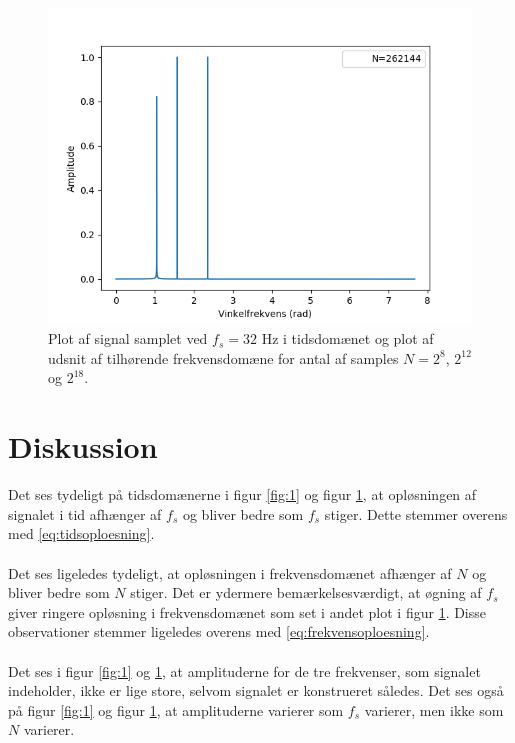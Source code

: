 \begin{figure}
\begin{minipage}{0.49\textwidth}
\includegraphics[width=\textwidth]{figures/frekvensanalyse/32hz_freq3.png}
\end{minipage}
\caption{Plot af signal samplet ved $f_s=32$ Hz i tidsdomænet og plot af udsnit af tilhørende frekvensdomæne for antal af samples $N=2^8$, $2^{12}$ og $2^{18}$.}
\label{fig:2}
\end{figure}
\section{Diskussion}
Det ses tydeligt på tidsdomænerne i figur \ref{fig:1} og figur \ref{fig:2}, at opløsningen af signalet i tid afhænger af $f_s$ og bliver bedre som $f_s$ stiger. Dette stemmer overens med \eqref{eq:tidsoploesning}.\\\\
Det ses ligeledes tydeligt, at opløsningen i frekvensdomænet afhænger af $N$ og bliver bedre som $N$ stiger. Det er ydermere bemærkelsesværdigt, at øgning af $f_s$ giver ringere opløsning i frekvensdomænet som set i andet plot i figur \ref{fig:2}. Disse observationer stemmer ligeledes overens med \eqref{eq:frekvensoploesning}.\\\\
Det ses i figur \ref{fig:1} og \ref{fig:2}, at amplituderne for de tre frekvenser, som signalet indeholder, ikke er lige store, selvom signalet er konstrueret således. Det ses også på figur \ref{fig:1} og figur \ref{fig:2}, at amplituderne varierer som $f_s$ varierer, men ikke som $N$ varierer. 
